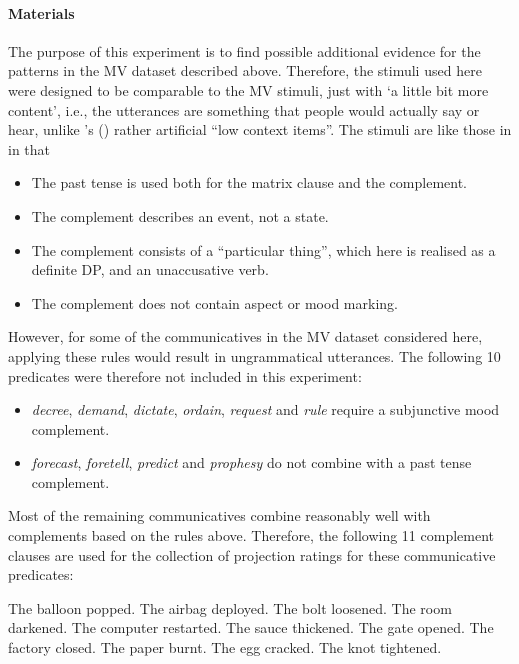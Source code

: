 \documentclass[11pt,fleqn]{article}
\newcommand{\6}{\mbox{$[\hspace*{-.6mm}[$}}
\newcommand{\9}{\mbox{$]\hspace*{-.6mm}]$}}
\newcommand{\citepos}[1]{\citeauthor{#1}'s (\citeyear{#1})}
\begin{document}
\paragraph{Materials}
The purpose of this experiment is to find possible additional evidence for the patterns in the MV dataset described above. Therefore, the stimuli used here were designed to be comparable to the MV stimuli, just with ‘a little bit more content’, i.e., the utterances are something that people would actually say or hear, unlike \citepos{white-rawlins-nels2018} rather artificial ``low context items”. The stimuli are like those in \cite{white-rawlins-nels2018} in that 
\begin{itemize}
	\item The past tense is used both for the matrix clause and the complement.
	\item The complement describes an event, not a state.
	\item The complement consists of a ``particular thing”, which here is realised as a definite DP, and an unaccusative verb.
	\item The complement does not contain aspect or mood marking.
\end{itemize}

However, for some of the communicatives in the MV dataset considered here, applying these rules would result in ungrammatical utterances. The following 10 predicates were therefore not included in this experiment:
\begin{itemize}
	\item \emph{decree}, \emph{demand}, \emph{dictate}, \emph{ordain}, \emph{request} and \emph{rule} require a subjunctive mood complement.
	\item \emph{forecast}, \emph{foretell}, \emph{predict} and \emph{prophesy} do not combine with a past tense complement.
\end{itemize}

Most of the remaining communicatives combine reasonably well with complements based on the rules above. Therefore, the following 11 complement clauses are used for the collection of projection ratings for these communicative predicates:
\begin{exe}
	\ex
	\begin{xlist}
		\ex The balloon popped.
		\ex The airbag deployed.
		\ex The bolt loosened.
		\ex The room darkened.
		\ex The computer restarted.
		\ex The sauce thickened.
		\ex The gate opened.
		\ex The factory closed.
		\ex The paper burnt.
		\ex The egg cracked.
		\ex The knot tightened.
	\end{xlist}
\end{exe}
\end{document}

